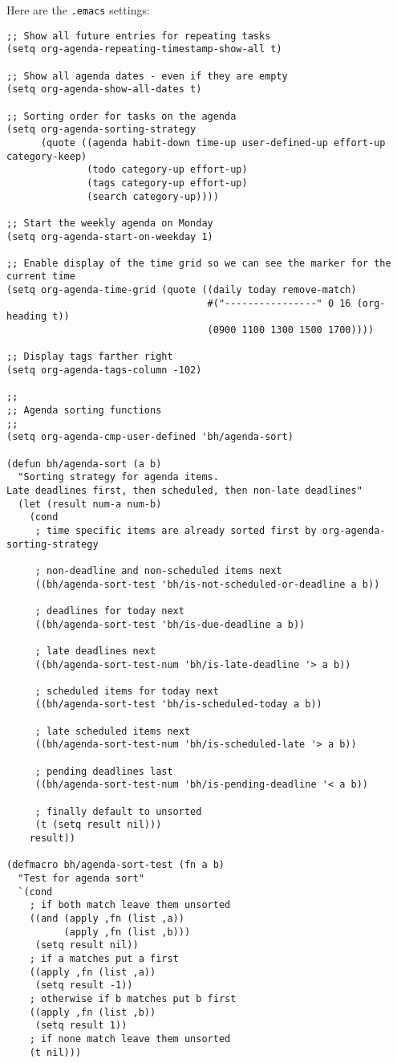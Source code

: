 \documentclass[11pt]{scrartcl}
\begin{document}
Here are the \texttt{.emacs} settings:
\begin{verbatim}
;; Show all future entries for repeating tasks
(setq org-agenda-repeating-timestamp-show-all t)

;; Show all agenda dates - even if they are empty
(setq org-agenda-show-all-dates t)

;; Sorting order for tasks on the agenda
(setq org-agenda-sorting-strategy
      (quote ((agenda habit-down time-up user-defined-up effort-up category-keep)
              (todo category-up effort-up)
              (tags category-up effort-up)
              (search category-up))))

;; Start the weekly agenda on Monday
(setq org-agenda-start-on-weekday 1)

;; Enable display of the time grid so we can see the marker for the current time
(setq org-agenda-time-grid (quote ((daily today remove-match)
                                   #("----------------" 0 16 (org-heading t))
                                   (0900 1100 1300 1500 1700))))

;; Display tags farther right
(setq org-agenda-tags-column -102)

;;
;; Agenda sorting functions
;;
(setq org-agenda-cmp-user-defined 'bh/agenda-sort)

(defun bh/agenda-sort (a b)
  "Sorting strategy for agenda items.
Late deadlines first, then scheduled, then non-late deadlines"
  (let (result num-a num-b)
    (cond
     ; time specific items are already sorted first by org-agenda-sorting-strategy

     ; non-deadline and non-scheduled items next
     ((bh/agenda-sort-test 'bh/is-not-scheduled-or-deadline a b))

     ; deadlines for today next
     ((bh/agenda-sort-test 'bh/is-due-deadline a b))

     ; late deadlines next
     ((bh/agenda-sort-test-num 'bh/is-late-deadline '> a b))

     ; scheduled items for today next
     ((bh/agenda-sort-test 'bh/is-scheduled-today a b))

     ; late scheduled items next
     ((bh/agenda-sort-test-num 'bh/is-scheduled-late '> a b))

     ; pending deadlines last
     ((bh/agenda-sort-test-num 'bh/is-pending-deadline '< a b))

     ; finally default to unsorted
     (t (setq result nil)))
    result))

(defmacro bh/agenda-sort-test (fn a b)
  "Test for agenda sort"
  `(cond
    ; if both match leave them unsorted
    ((and (apply ,fn (list ,a))
          (apply ,fn (list ,b)))
     (setq result nil))
    ; if a matches put a first
    ((apply ,fn (list ,a))
     (setq result -1))
    ; otherwise if b matches put b first
    ((apply ,fn (list ,b))
     (setq result 1))
    ; if none match leave them unsorted
    (t nil)))


\end{verbatim}
\end{document}

